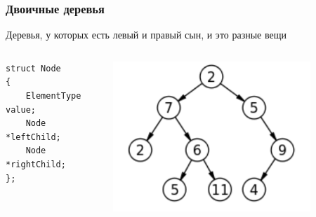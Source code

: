 \documentclass[xetex,mathserif,serif]{beamer}
\begin{document}
	\begin{frame}[fragile]
		\frametitle{Двоичные деревья}
		Деревья, у которых есть левый и правый сын, и это разные вещи
		\begin{columns}
			\begin{column}{0.4\textwidth}
				\begin{footnotesize}
					\begin{verbatim}
struct Node
{
    ElementType value;
    Node *leftChild;
    Node *rightChild;
};
					\end{verbatim}
				\end{footnotesize}
			\end{column}
			\begin{column}{0.5\textwidth}
				\begin{center}
					\includegraphics[width=0.8\textwidth]{binary-tree.png}
				\end{center}
			\end{column}
		\end{columns}
	\end{frame}
\end{document}
